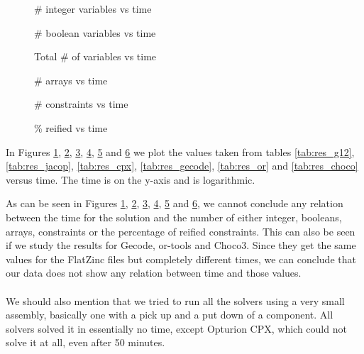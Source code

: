 \begin{figure}[H]
\centering

\caption{\# integer variables vs time}
\label{fig:int_vs_time}
\end{figure}

\begin{figure}[H]
\centering

\caption{\# boolean variables vs time}
\label{fig:bool_vs_time}
\end{figure}

\begin{figure}[H]
\centering

\caption{Total \# of variables vs time}
\label{fig:tot_vs_time}
\end{figure}

\begin{figure}[H]
\centering

\caption{\# arrays vs time}
\label{fig:arr_vs_time}
\end{figure}

\begin{figure}[H]
\centering

\caption{\# constraints vs time}
\label{fig:const_vs_time}
\end{figure}

\begin{figure}[H]
\centering

\caption{\% reified vs time}
\label{fig:reif_vs_time}
\end{figure}

In Figures \ref{fig:int_vs_time}, \ref{fig:bool_vs_time}, \ref{fig:tot_vs_time}, \ref{fig:arr_vs_time}, \ref{fig:const_vs_time} and \ref{fig:reif_vs_time} we plot the values taken from tables \ref{tab:res_g12}, \ref{tab:res_jacop}, \ref{tab:res_cpx}, \ref{tab:res_gecode}, \ref{tab:res_or} and \ref{tab:res_choco} versus time. The time is on the y-axis and is logarithmic.

As can be seen in Figures \ref{fig:int_vs_time}, \ref{fig:bool_vs_time}, \ref{fig:tot_vs_time}, \ref{fig:arr_vs_time}, \ref{fig:const_vs_time} and \ref{fig:reif_vs_time}, we cannot conclude any relation between the time for the solution and the number of either integer, booleans, arrays, constraints or the percentage of reified constraints. This can also be seen if we study the results for Gecode, or-tools and Choco3. Since they get the same values for the FlatZinc files but completely different times, we can conclude that our data does not show any relation between time and those values.
\\\\
We should also mention that we tried to run all the solvers using a very small assembly, basically one with a pick up and a put down of a component. All solvers solved it in essentially no time, except Opturion CPX, which could not solve it at all, even after 50 minutes.
